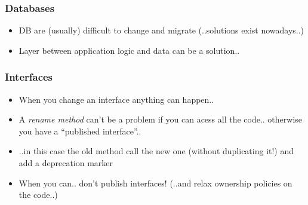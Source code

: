 \documentclass{beamer}
\begin{document}
\begin{frame}
  \frametitle{Databases} 
  \begin{itemize}
  		\item<+-> DB are (usually) difficult to change and migrate (..solutions exist nowadays..)
  		\item<+-> Layer between application logic and data can be a solution..
  \end{itemize}
\end{frame}

\begin{frame}
  \frametitle{Interfaces} 
  \begin{itemize}
  		\item<+-> When you change an interface anything can happen..
  		\item<+-> A \textit{rename method} can't be a problem if you can acess all the code.. otherwise you have a ``published interface''..
  		\item<+-> ..in this case the old method call the new one (without duplicating it!) and add a deprecation marker
  		\item<+-> When you can.. don't publish interfaces! (..and relax ownership policies on the code..)
  \end{itemize}
\end{frame}
\end{document}
